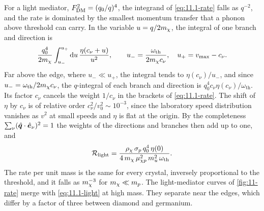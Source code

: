 For a light mediator, $F_{\mathrm{DM}}^2 = (q_0/q)^4$, the integrand of \cref{eq:11.1-rate} falls as $q^{-2}$, and the rate is dominated by the smallest momentum transfer that a phonon above threshold can carry. In the variable $u = q/2m_{\chi}$, the integral of one branch and direction is
\begin{equation*}
  \frac{q_0^4}{2m_{\chi}}\int_{u_-}^{u_+}\mathrm{d} u\,\frac{\eta(c_\nu + u)}{u^2} , \qquad u_- = \frac{\omega_{\mathrm{th}}}{2m_{\chi} c_\nu} , \quad u_+ = v_{\mathrm{max}} - c_\nu .
\end{equation*}
Far above the edge, where $u_- \ll u_+$, the integral tends to $\eta(c_\nu)/u_-$, and since $u_- = \omega_{\mathrm{th}}/2m_{\chi} c_\nu$, the $q$-integral of each branch and direction is $q_0^4c_\nu\eta(c_\nu)/\omega_{\mathrm{th}}$. Its factor $c_\nu$ cancels the weight $1/c_\nu$ in the brackets of \cref{eq:11.1-rate}. The shift of $\eta$ by $c_\nu$ is of relative order $c_\nu^2/v_0^2 \sim 10^{-3}$, since the laboratory speed distribution vanishes as $v^2$ at small speeds and $\eta$ is flat at the origin. By the completeness $\sum_\nu(\hat{\bm{q}}\cdot\hat{\bm{e}}_\nu)^2 = 1$ the weights of the directions and branches then add up to one, and
\begin{equation}
  \mathcal{R}_{\mathrm{light}} = \frac{\rho_\chi\,\sigma_p\,q_0^4\,\eta(0)}{4\,m_{\chi}\,\mu_{\chi p}^2\,m_u^2\,\omega_{\mathrm{th}}} .
  \label{eq:11.1-light}
\end{equation}
The rate per unit mass is the same for every crystal, inversely proportional to the threshold, and it falls as $m_{\chi}^{-3}$ for $m_{\chi} \ll m_p$. The light-mediator curves of \cref{fig:11-rate} merge with \cref{eq:11.1-light} at high mass. They separate near the edges, which differ by a factor of three between diamond and germanium.


